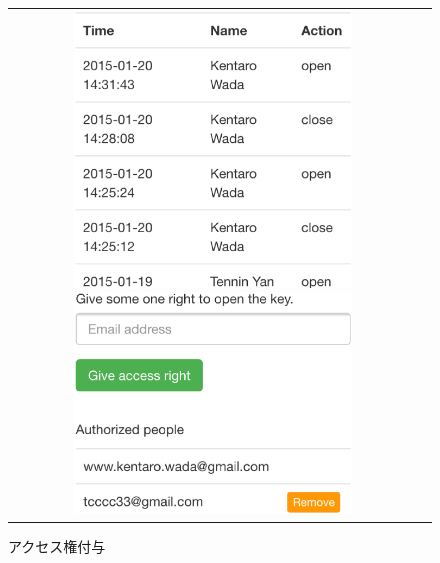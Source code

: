 \begin{figure}[htbp]
  \begin{tabular}{cc}
    \begin{minipage}{0.5\hsize}
      \begin{center}
        \includegraphics[width=0.7\textwidth]{./assets/log_page.eps}
        \caption{ログ確認}
        \label{fig:log_page}
      \end{center}
    \end{minipage}
    \begin{minipage}{0.5\hsize}
      \begin{center}
        \includegraphics[width=0.7\textwidth]{./assets/authorize_page.eps}
        \caption{アクセス権付与}
        \label{fig:authorize_page}
      \end{center}
    \end{minipage}
  \end{tabular}
\end{figure}

